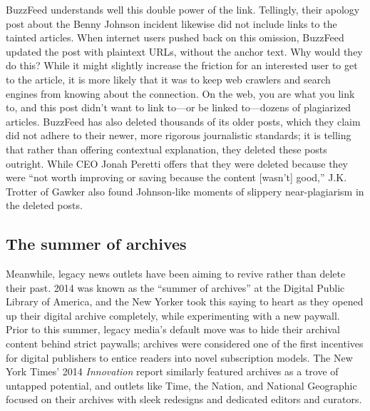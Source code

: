 BuzzFeed understands well this double power of the link. Tellingly, their apology post about the Benny Johnson incident likewise did not include links to the tainted articles. When internet users pushed back on this omission, BuzzFeed updated the post with plaintext URLs, without the anchor text.\autocite{smith_editors_2014} Why would they do this? While it might slightly increase the friction for an interested user to get to the article, it is more likely that it was to keep web crawlers and search engines from knowing about the connection. On the web, you are what you link to, and this post didn't want to link to---or be linked to---dozens of plagiarized articles. BuzzFeed has also deleted thousands of its older posts, which they claim did not adhere to their newer, more rigorous journalistic standards; it is telling that rather than offering contextual explanation, they deleted these posts outright. While CEO Jonah Peretti offers that they were deleted because they were ``not worth improving or saving because the content [wasn't] good,'' J.K. Trotter of Gawker also found Johnson-like moments of slippery near-plagiarism in the deleted posts.\autocite{trotter_over_2014, trotter_dont_2014}


\subsection{The summer of archives}

Meanwhile, legacy news outlets have been aiming to revive rather than delete their past. 2014 was known as the ``summer of archives'' at the Digital Public Library of America, and the New Yorker took this saying to heart as they opened up their digital archive completely, while experimenting with a new paywall. Prior to this summer, legacy media's default move was to hide their archival content behind strict paywalls; archives were considered one of the first incentives for digital publishers to entice readers into novel subscription models. The New York Times' 2014 \emph{Innovation} report similarly featured archives as a trove of untapped potential, and outlets like Time, the Nation, and National Geographic focused on their archives with sleek redesigns and dedicated editors and curators.

